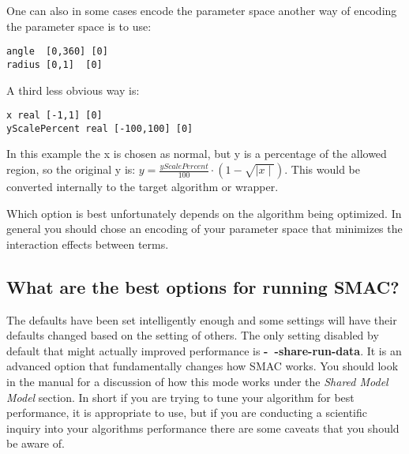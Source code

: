 \documentclass[11pt,letterpaper,oneside]{article}
\begin{document}
One can also in some cases encode the parameter space another way of encoding the parameter space is to use:

\begin{verbatim}
angle  [0,360] [0]
radius [0,1]  [0]
\end{verbatim}

A third less obvious way is:

\begin{verbatim}
x real [-1,1] [0]
yScalePercent real [-100,100] [0]
\end{verbatim}

In this example the x is chosen as normal, but y is a percentage of the allowed region, so the original y is: $y=\frac{yScalePercent}{100}\cdot (1-\sqrt{\mid x \mid }) $. This would be converted internally to the target algorithm or wrapper.

Which option is best unfortunately depends on the algorithm being optimized. In general you should chose an encoding of your parameter space that minimizes the interaction effects between terms.



\subsection{What are the best options for running SMAC?}
\label{question:sharedModelMode}

	The defaults have been set intelligently enough and some settings will have their defaults changed based on the setting of others. The only setting disabled by default that might actually improved performance is \textbf{-~$\!$-share-run-data}. It is an advanced option that fundamentally changes how SMAC works. You should look in the manual for a discussion of how this mode works under the \emph{Shared Model Model} section. In short if you are trying to tune your algorithm for best performance, it is appropriate to use, but if you are conducting a scientific inquiry into your algorithms performance there are some caveats that you should be aware of. 
\end{document}
